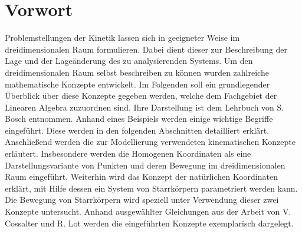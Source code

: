 \chapter{Vorwort}
Problemstellungen der Kinetik lassen sich in geeigneter Weise im dreidimensionalen Raum formulieren. Dabei dient dieser zur Beschreibung der Lage und der Lage\"anderung des zu analysierenden Systems. \newline
Um den dreidimensionalen Raum selbst beschreiben zu k\"onnen wurden zahlreiche mathematische Konzepte entwickelt. Im Folgenden soll ein grundlegender \"Uberblick \"uber diese Konzepte gegeben werden, welche dem Fachgebiet der Linearen Algebra zuzuordnen sind. Ihre Darstellung ist dem Lehrbuch von S. Bosch \cite{Bosch2014} entnommen. Anhand eines Beispiels werden einige wichtige Begriffe eingef\"uhrt. Diese werden in den folgenden Abschnitten detailliert erkl\"art. Anschlie\ss{}end werden die zur Modellierung verwendeten kinematischen Konzepte erl\"autert. Insbesondere werden die Homogenen Koordinaten als eine Darstellungsvariante von Punkten und deren Bewegung im dreidimensionalen Raum eingef\"uhrt. Weiterhin wird das Konzept der nat\"urlichen Koordinaten erkl\"art, mit Hilfe dessen ein System von Starrk\"orpern parametriert werden kann. Die Bewegung von Starrk\"orpern wird speziell unter Verwendung dieser zwei Konzepte untersucht. Anhand ausgew\"ahlter Gleichungen aus der Arbeit von V. Cossalter und R. Lot \cite{Cossalter2002} werden die eingef\"uhrten Konzepte exemplarisch dargelegt.